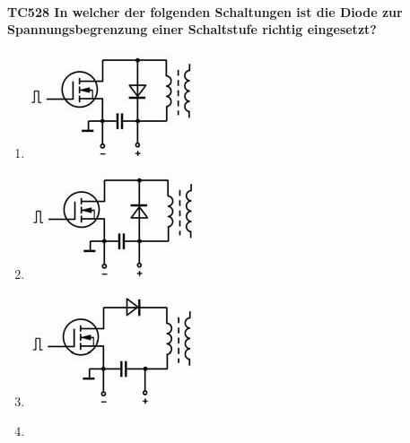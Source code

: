 \documentclass[8pt]{article}
\begin{document}
\begin{enumerate}
\begin{enumerate}[nolistsep,label=\Alph*]
{\begin{enumerate}[nolistsep,label=\Alph*]
\paragraph*{TC528 In welcher der folgenden Schaltungen ist die Diode zur Spannungsbegrenzung einer Schaltstufe richtig eingesetzt?}
\begin{enumerate}[nolistsep,label=\Alph*]
\item
	\begin{center}
		\begin{minipage}{\linewidth}
			\centering
			\includegraphics[scale=1.0]{pics/tc528_a.jpg}
		\end{minipage}
	\end{center}
\item
	\begin{center}
		\begin{minipage}{\linewidth}
			\centering
			\includegraphics[scale=1.0]{pics/tc528_b.jpg}
		\end{minipage}
	\end{center}
\item
	\begin{center}
		\begin{minipage}{\linewidth}
			\centering
			\includegraphics[scale=1.0]{pics/tc528_c.jpg}
		\end{minipage}
	\end{center}
\item
	\begin{center}
		\begin{minipage}{\linewidth}

\end{minipage}
\end{center}
\end{enumerate}
\end{enumerate}}
\end{enumerate}
\end{enumerate}
\end{document}
